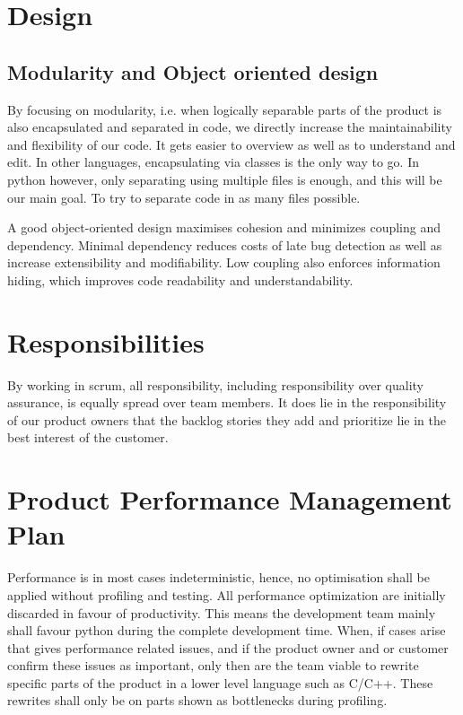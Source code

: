 \documentclass{article}
\begin{document}
\section{Design}

\subsection{Modularity and Object oriented design}
By focusing on modularity, i.e. when logically separable parts of the product is also encapsulated and separated in code, we directly increase the maintainability and flexibility of our code.
It gets easier to overview as well as to understand and edit.
In other languages, encapsulating via classes is the only way to go.
In python however, only separating using multiple files is enough, and this will be our main goal.
To try to separate code in as many files possible.

A good object-oriented design maximises cohesion and minimizes coupling and dependency.
Minimal dependency reduces costs of late bug detection as well as increase extensibility and modifiability.
Low coupling also enforces information hiding, which improves code readability and understandability.

\section{Responsibilities}
By working in scrum, all responsibility, including responsibility over quality assurance, is equally spread over team members.
It does lie in the responsibility of our product owners that the backlog stories they add and prioritize lie in the best interest of the customer.

\section{Product Performance Management Plan}
Performance is in most cases indeterministic, hence, no optimisation shall be applied without profiling and testing. 
All performance optimization are initially discarded in favour of productivity.
This means the development team mainly shall favour python during the complete development time.
When, if cases arise that gives performance related issues, and if the product owner and or customer confirm these issues as important, only then are the team viable to rewrite specific parts of the product in a lower level language such as C/C++.
These rewrites shall only be on parts shown as bottlenecks during profiling.
\end{document}
